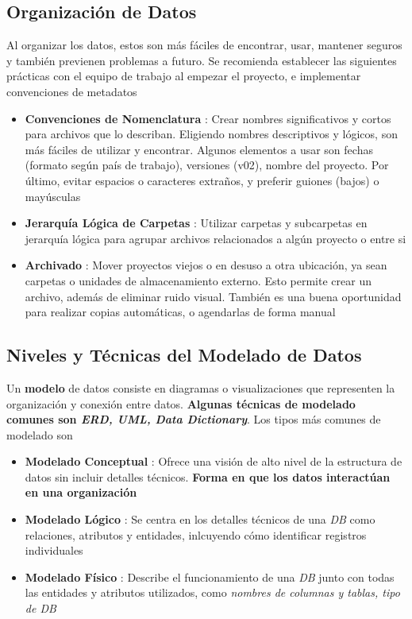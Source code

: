 \subsection{Organización de Datos}
Al organizar los datos, estos son más fáciles de encontrar, usar, mantener seguros y también previenen problemas a futuro. Se recomienda establecer las siguientes prácticas con el equipo de trabajo al empezar el proyecto, e implementar convenciones de metadatos
\begin{itemize}
    \item {\textbf{Convenciones de Nomenclatura} : Crear nombres significativos y cortos para archivos que lo describan. Eligiendo nombres descriptivos y lógicos, son más fáciles de utilizar y encontrar. Algunos elementos a usar son fechas (formato según país de trabajo), versiones (v02), nombre del proyecto. Por último, evitar espacios o caracteres extraños, y preferir guiones (bajos) o mayúsculas}
    \item {\textbf{Jerarquía Lógica de Carpetas} : Utilizar carpetas y subcarpetas en jerarquía lógica para agrupar archivos relacionados a algún proyecto o entre si}
    \item {\textbf{Archivado} : Mover proyectos viejos o en desuso a otra ubicación, ya sean carpetas o unidades de almacenamiento externo. Esto permite crear un archivo, además de eliminar ruido visual. También es una buena oportunidad para realizar copias automáticas, o agendarlas de forma manual}
\end{itemize}

\subsection{Niveles y Técnicas del Modelado de Datos}
Un \textbf{modelo} de datos consiste en diagramas o visualizaciones que representen la organización y conexión entre datos. \textbf{Algunas técnicas de modelado comunes son \textit{ERD, UML, Data Dictionary}}. Los tipos más comunes de modelado son 
\begin{itemize}
    \item {\textbf{Modelado Conceptual} : Ofrece una visión de alto nivel de la estructura de datos sin incluir detalles técnicos. \textbf{Forma en que los datos interactúan en una organización}}
    \item {\textbf{Modelado Lógico} : Se centra en los detalles técnicos de una \textit{DB} como relaciones, atributos y entidades, inlcuyendo cómo identificar registros individuales}
    \item {\textbf{Modelado Físico} : Describe el funcionamiento de una \textit{DB} junto con todas las entidades y atributos utilizados, como \textit{ nombres de columnas y tablas, tipo de DB}} 
\end{itemize}

